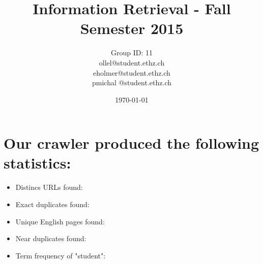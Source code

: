 \documentclass[a4paper, 11pt]{article}
\begin{document}
\title{Information Retrieval - Fall Semester 2015}
\author{Group ID: 11 \\ ollel@student.ethz.ch\\ eholmer@student.ethz.ch\\ pmichal
@student.ethz.ch\\}
\date{\today}
\maketitle

\section*{Our crawler produced the following statistics: } 
\begin{itemize}
  \item Distincs URLs found: 
  \item Exact duplicates found:
  \item Unique English pages found: 
  \item Near duplicates found:
  \item Term frequency of "student":  
\end{itemize}
\end{document}
